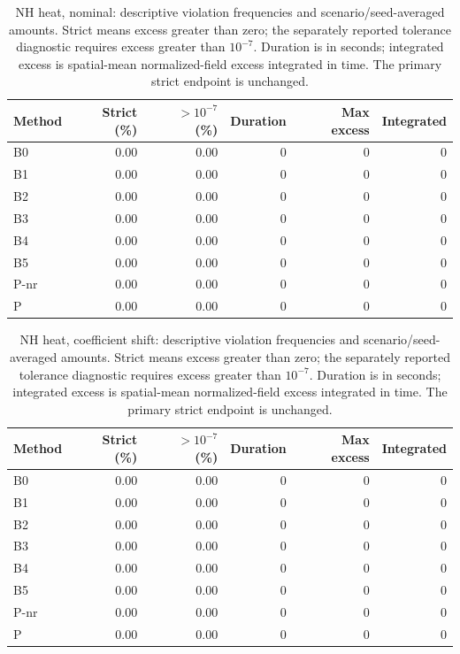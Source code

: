 \begin{table}[ht]
\centering\small
\caption{NH heat, nominal: descriptive violation frequencies and scenario/seed-averaged amounts. Strict means excess greater than zero; the separately reported tolerance diagnostic requires excess greater than $10^{-7}$. Duration is in seconds; integrated excess is spatial-mean normalized-field excess integrated in time. The primary strict endpoint is unchanged.}\label{tab:new_heat_constraints_locked_nominal}
\begin{tabular}{@{}lrrrrr@{}}\toprule
Method & Strict (\%) & $>10^{-7}$ (\%) & Duration & Max excess & Integrated\\\midrule
B0 & 0.00 & 0.00 & 0 & 0 & 0\\
B1 & 0.00 & 0.00 & 0 & 0 & 0\\
B2 & 0.00 & 0.00 & 0 & 0 & 0\\
B3 & 0.00 & 0.00 & 0 & 0 & 0\\
B4 & 0.00 & 0.00 & 0 & 0 & 0\\
B5 & 0.00 & 0.00 & 0 & 0 & 0\\
P-nr & 0.00 & 0.00 & 0 & 0 & 0\\
P & 0.00 & 0.00 & 0 & 0 & 0\\
\bottomrule\end{tabular}
\end{table}

\begin{table}[ht]
\centering\small
\caption{NH heat, coefficient shift: descriptive violation frequencies and scenario/seed-averaged amounts. Strict means excess greater than zero; the separately reported tolerance diagnostic requires excess greater than $10^{-7}$. Duration is in seconds; integrated excess is spatial-mean normalized-field excess integrated in time. The primary strict endpoint is unchanged.}\label{tab:new_heat_constraints_locked_coefficient_ood}
\begin{tabular}{@{}lrrrrr@{}}\toprule
Method & Strict (\%) & $>10^{-7}$ (\%) & Duration & Max excess & Integrated\\\midrule
B0 & 0.00 & 0.00 & 0 & 0 & 0\\
B1 & 0.00 & 0.00 & 0 & 0 & 0\\
B2 & 0.00 & 0.00 & 0 & 0 & 0\\
B3 & 0.00 & 0.00 & 0 & 0 & 0\\
B4 & 0.00 & 0.00 & 0 & 0 & 0\\
B5 & 0.00 & 0.00 & 0 & 0 & 0\\
P-nr & 0.00 & 0.00 & 0 & 0 & 0\\
P & 0.00 & 0.00 & 0 & 0 & 0\\
\bottomrule\end{tabular}
\end{table}

